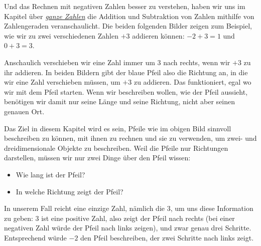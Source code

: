 \documentclass[../../main.tex]{subfiles}
\begin{document}
Und das Rechnen mit negativen Zahlen besser zu verstehen, haben wir uns im Kapitel über 
\hyperlink{chap:ganzezahlen}{\emph{ganze Zahlen}} die Addition und Subtraktion von Zahlen mithilfe von Zahlengeraden
veranschaulicht. Die beiden folgenden Bilder zeigen zum Beispiel, wie wir zu zwei verschiedenen Zahlen $+3$ addieren
können: $-2+3=1$ und $0+3=3$.

\begin{multicols}{2}
\centering



\end{multicols}

Anschaulich verschieben wir eine Zahl immer um 3 nach rechts, wenn wir $+3$ zu ihr addieren. In beiden Bildern gibt
der blaue Pfeil also die Richtung an, in die wir eine Zahl verschieben müssen, um $+3$ zu addieren. Das funktioniert,
egal wo wir mit dem Pfeil starten. Wenn wir beschreiben wollen, wie der Pfeil aussieht, benötigen wir damit nur seine
Länge und seine Richtung, nicht aber seinen genauen Ort.

Das Ziel in diesem Kapitel wird es sein, Pfeile wie im obigen Bild sinnvoll beschreiben zu können, mit ihnen zu rechnen 
und sie zu verwenden, um zwei- und dreidimensionale Objekte zu beschreiben. Weil die Pfeile nur Richtungen darstellen,
müssen wir nur zwei Dinge über den Pfeil wissen:
\begin{itemize}
    \item Wie lang ist der Pfeil?
    \item In welche Richtung zeigt der Pfeil?
\end{itemize}
In unserem Fall reicht eine einzige Zahl, nämlich die 3, um uns diese Information zu geben: 3 ist eine positive Zahl,
also zeigt der Pfeil nach rechts (bei einer negativen Zahl würde der Pfeil nach links zeigen), und zwar genau drei 
Schritte. Entsprechend würde $-2$ den Pfeil beschreiben, der zwei Schritte nach links zeigt.
\end{document}
